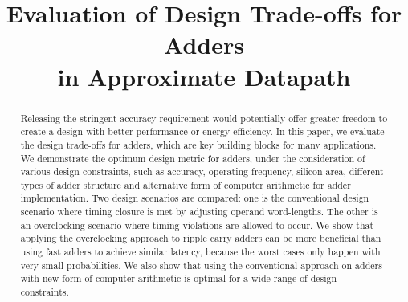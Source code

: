 \documentclass[10pt, conference, compsocconf]{IEEEtran}
\begin{document}
\title{Evaluation of Design Trade-offs for Adders\\ in Approximate Datapath}

\author{
\vspace{1ex}
}


\maketitle


\begin{abstract}
Releasing the stringent accuracy requirement would potentially offer greater freedom to create a design with better performance or energy efficiency. In this paper, we evaluate the design trade-offs for adders, which are key building blocks for many applications. We demonstrate the optimum design metric for adders, under the consideration of various design constraints, such as accuracy, operating frequency, silicon area, different types of adder structure and alternative form of computer arithmetic for adder implementation. Two design scenarios are compared: one is the conventional design scenario where timing closure is met by adjusting operand word-lengths. The other is an overclocking scenario where timing violations are allowed to occur. We show that applying the overclocking approach to ripple carry adders can be more beneficial than using fast adders to achieve similar latency, because the worst cases only happen with very small probabilities. We also show that using the conventional approach on adders with new form of computer arithmetic is optimal for a wide range of design constraints.



\end{abstract}
\end{document}
